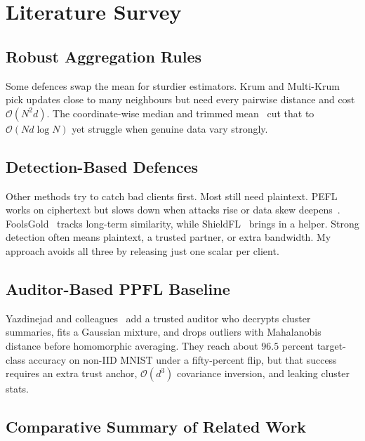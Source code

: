 \chapter{Literature Survey}
\label{Literature:chap:chap3}
\graphicspath{{12.Chapter3/Images/}}

\section{Robust Aggregation Rules}
\label{sec:lit-aggreg}

Some defences swap the mean for sturdier estimators. Krum and Multi-Krum~\cite{blanchard2017machine} pick updates close to many neighbours but need every pairwise distance and cost $\mathcal{O}(N^{2}d)$. The coordinate-wise median and trimmed mean~\cite{yin2018byzantine} cut that to $\mathcal{O}(Nd\log N)$ yet struggle when genuine data vary strongly.

\section{Detection-Based Defences}
\label{sec:lit-detect}

Other methods try to catch bad clients first. Most still need plaintext. PEFL~\cite{liu2021privacy} works on ciphertext but slows down when attacks rise or data skew deepens~\cite{yazdinejad2024robust}. FoolsGold~\cite{fung2020limitations} tracks long-term similarity, while ShieldFL~\cite{ma2022shieldfl} brings in a helper. Strong detection often means plaintext, a trusted partner, or extra bandwidth. My approach avoids all three by releasing just one scalar per client.

\section{Auditor-Based PPFL Baseline}
\label{sec:lit-auditor}

Yazdinejad and colleagues~\cite{yazdinejad2024robust} add a trusted auditor who decrypts cluster summaries, fits a Gaussian mixture, and drops outliers with Mahalanobis distance before homomorphic averaging. They reach about $96.5$ percent target-class accuracy on non-IID MNIST under a fifty-percent flip, but that success requires an extra trust anchor, $\mathcal{O}(d^{3})$ covariance inversion, and leaking cluster stats.

\section{Comparative Summary of Related Work}
\label{sec:lit-comparative}

